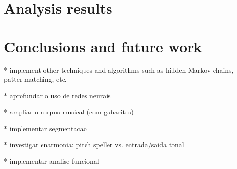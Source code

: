 \documentclass{article}
\begin{document}
\section{Analysis results}
\label{sec:analysis-results}

\section{Conclusions and future work}
\label{sec:concl-future-work}


* implement other techniques and algorithms such as hidden Markov
chains, patter matching, etc.

* aprofundar o uso de redes neurais

* ampliar o corpus musical (com gabaritos)

* implementar segmentacao

* investigar enarmonia: pitch speller vs. entrada/saida tonal

* implementar analise funcional



\end{document}
